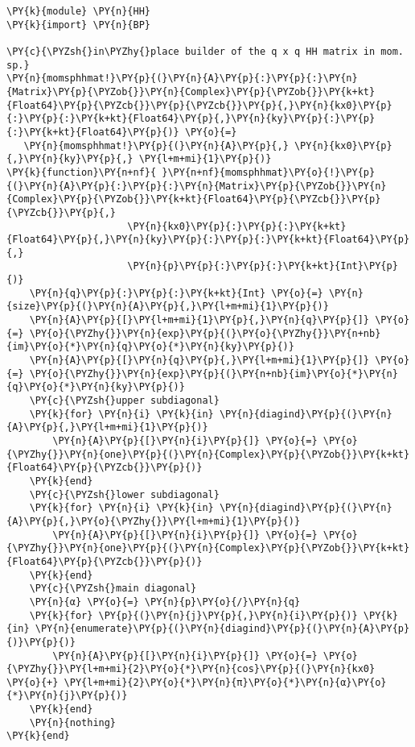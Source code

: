 \begin{Verbatim}[commandchars=\\\{\}]
\PY{k}{module} \PY{n}{HH}
\PY{k}{import} \PY{n}{BP}

\PY{c}{\PYZsh{}in\PYZhy{}place builder of the q x q HH matrix in mom. sp.}
\PY{n}{momsphhmat!}\PY{p}{(}\PY{n}{A}\PY{p}{:}\PY{p}{:}\PY{n}{Matrix}\PY{p}{\PYZob{}}\PY{n}{Complex}\PY{p}{\PYZob{}}\PY{k+kt}{Float64}\PY{p}{\PYZcb{}}\PY{p}{\PYZcb{}}\PY{p}{,}\PY{n}{kx0}\PY{p}{:}\PY{p}{:}\PY{k+kt}{Float64}\PY{p}{,}\PY{n}{ky}\PY{p}{:}\PY{p}{:}\PY{k+kt}{Float64}\PY{p}{)} \PY{o}{=}
   \PY{n}{momsphhmat!}\PY{p}{(}\PY{n}{A}\PY{p}{,} \PY{n}{kx0}\PY{p}{,}\PY{n}{ky}\PY{p}{,} \PY{l+m+mi}{1}\PY{p}{)}
\PY{k}{function}\PY{n+nf}{ }\PY{n+nf}{momsphhmat}\PY{o}{!}\PY{p}{(}\PY{n}{A}\PY{p}{:}\PY{p}{:}\PY{n}{Matrix}\PY{p}{\PYZob{}}\PY{n}{Complex}\PY{p}{\PYZob{}}\PY{k+kt}{Float64}\PY{p}{\PYZcb{}}\PY{p}{\PYZcb{}}\PY{p}{,}
                     \PY{n}{kx0}\PY{p}{:}\PY{p}{:}\PY{k+kt}{Float64}\PY{p}{,}\PY{n}{ky}\PY{p}{:}\PY{p}{:}\PY{k+kt}{Float64}\PY{p}{,}
                     \PY{n}{p}\PY{p}{:}\PY{p}{:}\PY{k+kt}{Int}\PY{p}{)}
    \PY{n}{q}\PY{p}{:}\PY{p}{:}\PY{k+kt}{Int} \PY{o}{=} \PY{n}{size}\PY{p}{(}\PY{n}{A}\PY{p}{,}\PY{l+m+mi}{1}\PY{p}{)}
    \PY{n}{A}\PY{p}{[}\PY{l+m+mi}{1}\PY{p}{,}\PY{n}{q}\PY{p}{]} \PY{o}{=} \PY{o}{\PYZhy{}}\PY{n}{exp}\PY{p}{(}\PY{o}{\PYZhy{}}\PY{n+nb}{im}\PY{o}{*}\PY{n}{q}\PY{o}{*}\PY{n}{ky}\PY{p}{)}
    \PY{n}{A}\PY{p}{[}\PY{n}{q}\PY{p}{,}\PY{l+m+mi}{1}\PY{p}{]} \PY{o}{=} \PY{o}{\PYZhy{}}\PY{n}{exp}\PY{p}{(}\PY{n+nb}{im}\PY{o}{*}\PY{n}{q}\PY{o}{*}\PY{n}{ky}\PY{p}{)}
    \PY{c}{\PYZsh{}upper subdiagonal}
    \PY{k}{for} \PY{n}{i} \PY{k}{in} \PY{n}{diagind}\PY{p}{(}\PY{n}{A}\PY{p}{,}\PY{l+m+mi}{1}\PY{p}{)}
        \PY{n}{A}\PY{p}{[}\PY{n}{i}\PY{p}{]} \PY{o}{=} \PY{o}{\PYZhy{}}\PY{n}{one}\PY{p}{(}\PY{n}{Complex}\PY{p}{\PYZob{}}\PY{k+kt}{Float64}\PY{p}{\PYZcb{}}\PY{p}{)}
    \PY{k}{end}
    \PY{c}{\PYZsh{}lower subdiagonal}
    \PY{k}{for} \PY{n}{i} \PY{k}{in} \PY{n}{diagind}\PY{p}{(}\PY{n}{A}\PY{p}{,}\PY{o}{\PYZhy{}}\PY{l+m+mi}{1}\PY{p}{)}
        \PY{n}{A}\PY{p}{[}\PY{n}{i}\PY{p}{]} \PY{o}{=} \PY{o}{\PYZhy{}}\PY{n}{one}\PY{p}{(}\PY{n}{Complex}\PY{p}{\PYZob{}}\PY{k+kt}{Float64}\PY{p}{\PYZcb{}}\PY{p}{)}
    \PY{k}{end}
    \PY{c}{\PYZsh{}main diagonal}
    \PY{n}{α} \PY{o}{=} \PY{n}{p}\PY{o}{/}\PY{n}{q}
    \PY{k}{for} \PY{p}{(}\PY{n}{j}\PY{p}{,}\PY{n}{i}\PY{p}{)} \PY{k}{in} \PY{n}{enumerate}\PY{p}{(}\PY{n}{diagind}\PY{p}{(}\PY{n}{A}\PY{p}{)}\PY{p}{)}
        \PY{n}{A}\PY{p}{[}\PY{n}{i}\PY{p}{]} \PY{o}{=} \PY{o}{\PYZhy{}}\PY{l+m+mi}{2}\PY{o}{*}\PY{n}{cos}\PY{p}{(}\PY{n}{kx0} \PY{o}{+} \PY{l+m+mi}{2}\PY{o}{*}\PY{n}{π}\PY{o}{*}\PY{n}{α}\PY{o}{*}\PY{n}{j}\PY{p}{)}
    \PY{k}{end}
    \PY{n}{nothing}
\PY{k}{end}


\end{Verbatim}
